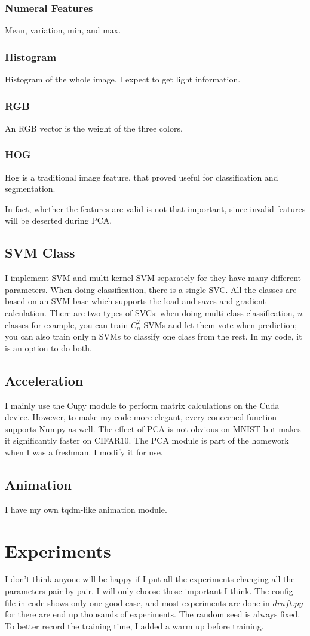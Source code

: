 \documentclass[conference]{IEEEtran}
\begin{document}
	\subsubsection{Numeral Features}
	Mean, variation, min, and max.
	\subsubsection{Histogram}
	Histogram of the whole image. I expect to get light information. 
	\subsubsection{RGB}
	An RGB vector is the weight of the three colors. 
	\subsubsection{HOG}
	Hog is a traditional image feature, that proved useful for classification and segmentation.
	
	In fact, whether the features are valid is not that important, since invalid features will be deserted during PCA.
	\subsection{SVM Class}
	I implement SVM and multi-kernel SVM separately for they have many different parameters. When doing classification, there is a single SVC. All the classes are based on an SVM base which supports the load and saves and gradient calculation. There are two types of SVCs: when doing multi-class classification, $n$ classes for example, you can train $C_n^2$ SVMs and let them vote when prediction; you can also train only n SVMs to classify one class from the rest. In my code, it is an option to do both. 
	\subsection{Acceleration}
	I mainly use the Cupy module to perform matrix calculations on the Cuda device. However, to make my code more elegant, every concerned function supports Numpy as well. The effect of PCA is not obvious on MNIST but makes it significantly faster on CIFAR10. The PCA module is part of the homework when I was a freshman. I modify it for use. 
	\subsection{Animation}
	I have my own tqdm-like animation module. 
	\section{\textbf{Experiments}}
	I don't think anyone will be happy if I put all the experiments changing all the parameters pair by pair. I will only choose those important I think. The config file in code shows only one good case, and most experiments are done in $draft.py$ for there are end up thousands of experiments. The random seed is always fixed. To better record the training time, I added a warm up before training. 
	
\end{document}
